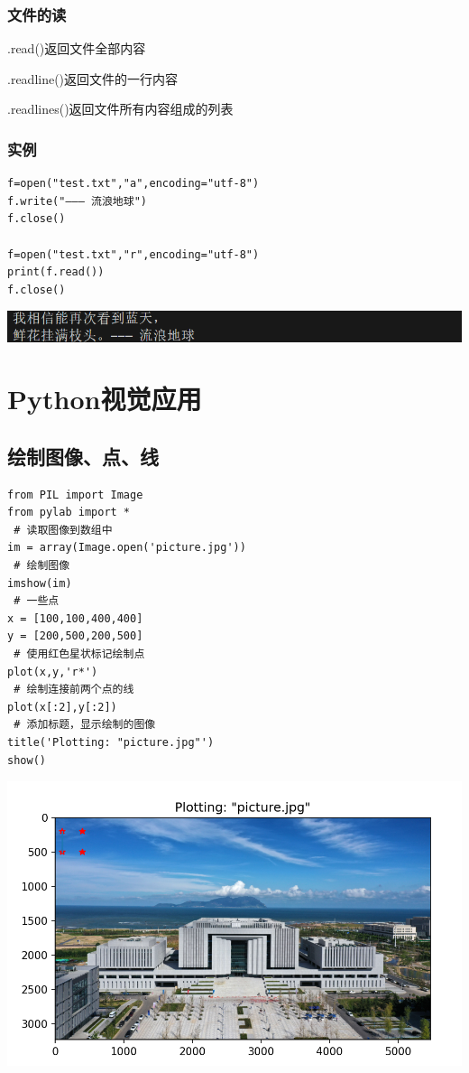 \documentclass[UTF8,a4paper]{ctexart}
\begin{document}
\subsubsection{文件的读}
.read()返回文件全部内容\par
.readline()返回文件的一行内容\par
.readlines()返回文件所有内容组成的列表\par
\subsubsection{实例}
\begin{lstlisting}
f=open("test.txt","a",encoding="utf-8")
f.write("——— 流浪地球")
f.close()

f=open("test.txt","r",encoding="utf-8")
print(f.read())
f.close()

\end{lstlisting}
\includegraphics[width=1\textwidth]{./python/file1.png}

\section{Python视觉应用}
\subsection{绘制图像、点、线}
\begin{lstlisting}
from PIL import Image
from pylab import *
 # 读取图像到数组中
im = array(Image.open('picture.jpg'))
 # 绘制图像
imshow(im)
 # 一些点
x = [100,100,400,400]
y = [200,500,200,500]
 # 使用红色星状标记绘制点
plot(x,y,'r*')
 # 绘制连接前两个点的线
plot(x[:2],y[:2])
 # 添加标题，显示绘制的图像
title('Plotting: "picture.jpg"')
show()
\end{lstlisting}
\includegraphics[width=1\textwidth]{./python/visual4.png}
\end{document}
